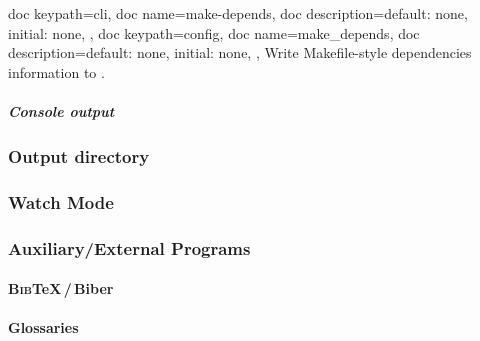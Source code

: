\documentclass[a4paper, 11pt]{scrartcl}
\providecommand\BibTeX{\textsc{Bib}\TeX\xspace}
\begin{document}
\begin{docKeys}[
		doc parameter={=\meta{make\_depends}},
	]{
		{
			doc keypath=cli,
			doc name=make-depends,
			doc description={default: none, initial: none},
		},
		{
			doc keypath=config,
			doc name=make_depends,
			doc description={default: none, initial: none},
		},
	}
	Write Makefile-style dependencies information to .
\end{docKeys}

\subparagraph{Console output}

\subsubsection{Output directory}

\subsubsection{Watch Mode}

\subsubsection{Auxiliary/External Programs}

\paragraph{\BibTeX\,/\,Biber}

\paragraph{Glossaries}
\end{document}
